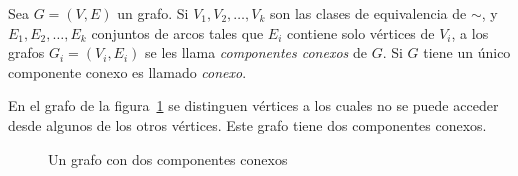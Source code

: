   \begin{definition}
    Sea \(G= (V, E)\) un grafo.
    Si \(V_1, V_2, \dotsc, V_k\)
    son las clases de equivalencia de \(\sim\),
    y \(E_1, E_2, \dots, E_k\)
    conjuntos de arcos tales que \(E_i\)
    contiene solo vértices de \(V_i\),
    a los grafos \(G_i = (V_i, E_i)\)
    se les llama \emph{componentes conexos} de \(G\).
    Si \(G\) tiene un único componente conexo
    es llamado \emph{conexo}.
  \end{definition}

  En el grafo de la figura~\ref{fig:2componentes}
  se distinguen vértices a los cuales
  no se puede acceder desde algunos de los otros vértices.
  Este grafo tiene dos componentes conexos.
  \begin{figure}[htbp]
    \centering
    \caption{Un grafo con dos componentes conexos}
    \label{fig:2componentes}
  \end{figure}

